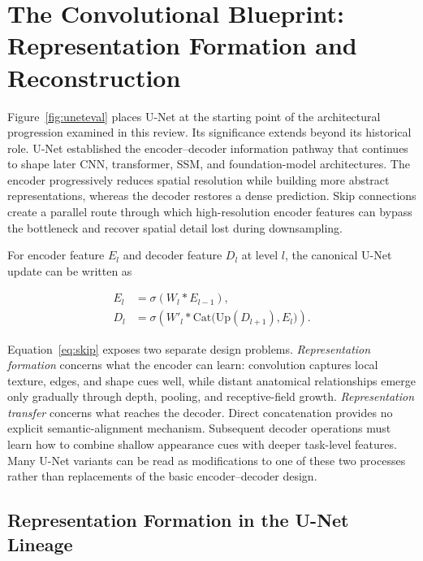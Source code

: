 \documentclass[5p,times,authoryear]{elsarticle}
\begin{document}
\section{The Convolutional Blueprint: Representation Formation and Reconstruction}
\label{sec:cnn}


Figure~\ref{fig:uneteval} places U-Net at the starting point of the architectural progression examined in this review. Its significance extends beyond its historical role. U-Net established the encoder--decoder information pathway that continues to shape later CNN, transformer, SSM, and foundation-model architectures. The encoder progressively reduces spatial resolution while building more abstract representations, whereas the decoder restores a dense prediction. Skip connections create a parallel route through which high-resolution encoder features can bypass the bottleneck and recover spatial detail lost during downsampling.

For encoder feature $E_l$ and decoder feature $D_l$ at level $l$, the canonical U-Net update can be written as

\begin{equation}
\label{eq:skip}
\begin{aligned}
E_l &= \sigma(W_l * E_{l-1}),\\
D_l &= \sigma\!\left(W'_l * \mathrm{Cat}\big(\mathrm{Up}(D_{l+1}),E_l\big)\right).
\end{aligned}
\end{equation}

Equation~\ref{eq:skip} exposes two separate design problems. \emph{Representation formation} concerns what the encoder can learn: convolution captures local texture, edges, and shape cues well, while distant anatomical relationships emerge only gradually through depth, pooling, and receptive-field growth. \emph{Representation transfer} concerns what reaches the decoder. Direct concatenation provides no explicit semantic-alignment mechanism. Subsequent decoder operations must learn how to combine shallow appearance cues with deeper task-level features. Many U-Net variants can be read as modifications to one of these two processes rather than replacements of the basic encoder--decoder design.

\subsection{Representation Formation in the U-Net Lineage}
\end{document}
